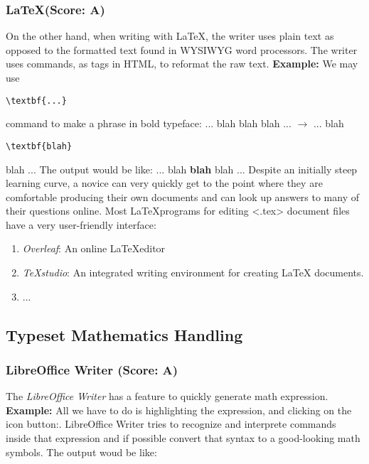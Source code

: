 \documentclass[twocolumn]{article}
\begin{document}
\subsubsection{\LaTeX (Score: A)}
On the other hand, when writing with LaTeX, the writer uses plain text as
opposed to the formatted text found in WYSIWYG word processors. The writer uses
commands, as tags in HTML, to reformat the raw text.
\newline
\textbf{Example:} We may use
\begin{verbatim}
\textbf{...}
\end{verbatim}
command to make a phrase in bold typeface:
... blah blah blah ...
$\rightarrow$
... blah
\begin{verbatim}
\textbf{blah}
\end{verbatim}
blah ...
\newline
The output would be like:
\newline
... blah \textbf{blah} blah ...
\newline
Despite an initially steep learning curve, a novice can very quickly get to the
point where they are comfortable producing their own documents and can look up
answers to many of their questions online.
\newline
Most \LaTeX programs for editing <.tex> document files have a very user-friendly
interface:
\begin{enumerate}
\item \textit{Overleaf}: An online \LaTeX editor
\item \textit{TeXstudio}: An integrated writing environment for creating LaTeX
documents.
\item ...
\end{enumerate}
\subsection{Typeset Mathematics Handling}
\subsubsection{LibreOffice Writer (Score: A)}
The \textit{LibreOffice Writer} has a feature to quickly generate math
expression.
\textbf{Example:} All we have to do is highlighting the expression, and clicking
on the icon button:. LibreOffice Writer tries to recognize and interprete
commands inside that expression and if possible convert that syntax to a
good-looking math symbols.
\newline
The output woud be like:
\newline
\end{document}
